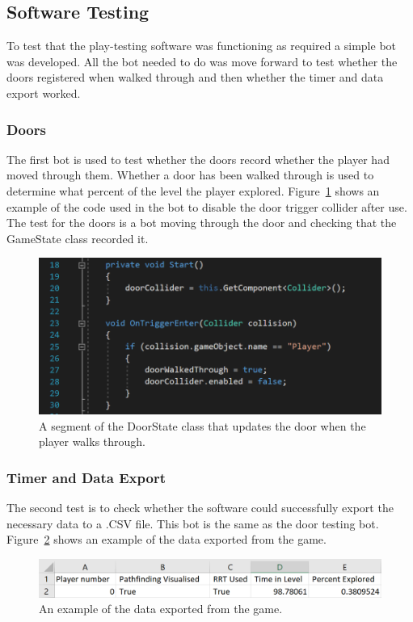 \documentclass[journal]{IEEEtran}
\begin{document}
	\subsection{Software Testing} \label{softtest}
	To test that the play-testing software was functioning as required a simple bot was developed. All the bot needed to do was move forward to test whether the doors registered when walked through and then whether the timer and data export worked.
	
	\subsubsection{Doors}
	The first bot is used to test whether the doors record whether the player had moved through them. Whether a door has been walked through is used to determine what percent of the level the player explored. Figure~\ref{image:DoorCode} shows an example of the code used in the bot to disable the door trigger collider after use. The test for the doors is a bot moving through the door and checking that the GameState class recorded it.
	
	\begin{figure}[h]
		\includegraphics[width=1.0\linewidth]{DoorCode.png}
		\caption{A segment of the DoorState class that updates the door when the player walks through.}
		\label{image:DoorCode}
	\end{figure} 
	
	\subsubsection{Timer and Data Export}
	The second test is to check whether the software could successfully export the necessary data to a .CSV file. This bot is the same as the door testing bot. Figure~\ref{image:ExportData} shows an example of the data exported from the game.  
	
	\begin{figure}[h]
		\includegraphics[width=1.0\linewidth]{ExportData.png}
		\caption{An example of the data exported from the game.}
		\label{image:ExportData}
	\end{figure} 
	
\end{document}
